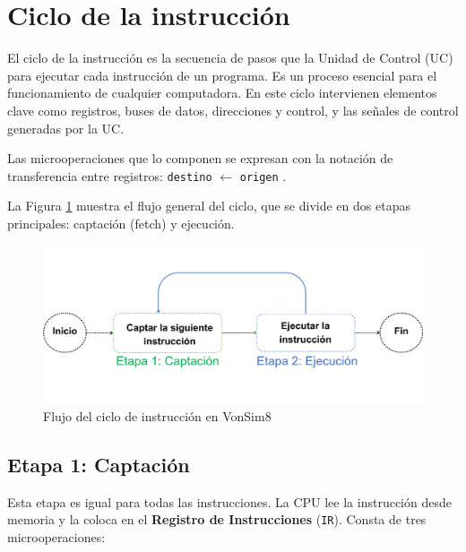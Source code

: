 \documentclass[12pt,oneside]{templates/unerthesis}
\begin{document}
\hypertarget{ciclo-de-la-instrucciuxf3n}{%
\section{Ciclo de la instrucción}\label{ciclo-de-la-instrucciuxf3n}}

El ciclo de la instrucción es la secuencia de pasos que la Unidad de Control (UC) para ejecutar cada instrucción de un programa. Es un proceso esencial para el funcionamiento de cualquier computadora. En este ciclo intervienen elementos clave como registros, buses de datos, direcciones y control, y las señales de control generadas por la UC.

Las microoperaciones que lo componen se expresan con la notación de transferencia entre registros: \texttt{destino} \(\leftarrow\) \texttt{origen} .

La Figura \ref{fig:flujoCicloInstruccion} muestra el flujo general del ciclo, que se divide en dos etapas principales: captación (fetch) y ejecución.

\begin{figure}

{\centering \includegraphics[width=0.85\linewidth]{images/cicloinstruccion3} 

}

\caption{Flujo del ciclo de instrucción en VonSim8}\label{fig:flujoCicloInstruccion}
\end{figure}

\hypertarget{etapa-1-captaciuxf3n}{%
\subsection{Etapa 1: Captación}\label{etapa-1-captaciuxf3n}}

Esta etapa es igual para todas las instrucciones. La CPU lee la instrucción desde memoria y la coloca en el \textbf{Registro de Instrucciones} (\texttt{IR}). Consta de tres microoperaciones:
\end{document}
